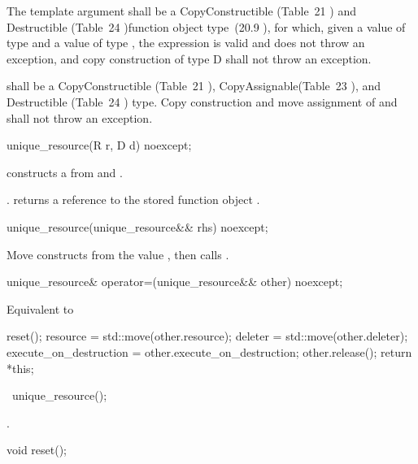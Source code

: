 \documentclass[ebook,11pt,article]{memoir}
\begin{document}
\pnum 
The template argument
 shall be a CopyConstructible (Table~21
) and Destructible 
(Table~24
)function object type~(20.9
), 
for which, given
a value  of type  and a value
 of type , the expression
 is valid and does not throw an exception,
and copy construction of type D shall not throw an exception.

\pnum
{} shall be a CopyConstructible (Table~21
), CopyAssignable(Table~23
), and  Destructible 
(Table~24
) type.
Copy construction and move assignment of  and  shall not throw an exception.

\begin{itemdecl}
unique_resource(R r, D d) noexcept;
\end{itemdecl}

\begin{itemdescr}
\pnum
\effects constructs a  from  and .

\pnum
\postconditions {}.
 returns a reference to the stored
function object .
\end{itemdescr}

\begin{itemdecl}
unique_resource(unique_resource&& rhs) noexcept;
\end{itemdecl}

\pnum
\effects Move constructs from the value , then calls .

\begin{itemdecl}
unique_resource& operator=(unique_resource&& other) noexcept;
\end{itemdecl}
\pnum
\effects Equivalent to
\begin{codeblock}
  reset();
  resource = std::move(other.resource);
  deleter = std::move(other.deleter);
  execute_on_destruction = other.execute_on_destruction;
  other.release();
  return *this;
\end{codeblock}

\begin{itemdecl}
~unique_resource();
\end{itemdecl}

\pnum
\effects {}.

\begin{itemdecl}
void reset();
\end{itemdecl}
\end{document}

